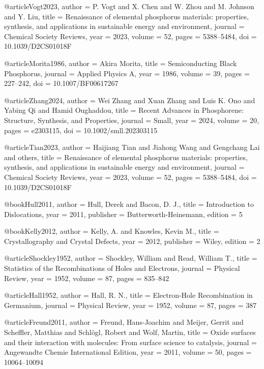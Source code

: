 @article{Vogt2023,
  author    = {P. Vogt and X. Chen and W. Zhou and M. Johnson and Y. Liu},
  title     = {Renaissance of elemental phosphorus materials: properties, synthesis, and applications in sustainable energy and environment},
  journal   = {Chemical Society Reviews},
  year      = {2023},
  volume    = {52},
  pages     = {5388--5484},
  doi       = {10.1039/D2CS01018F}
}

@article{Morita1986,
  author    = {Akira Morita},
  title     = {Semiconducting Black Phosphorus},
  journal   = {Applied Physics A},
  year      = {1986},
  volume    = {39},
  pages     = {227--242},
  doi       = {10.1007/BF00617267}
}

@article{Zhang2024,
  author    = {Wei Zhang and Xuan Zhang and Luis K. Ono and Yabing Qi and Hamid Oughaddou},
  title     = {Recent Advances in Phosphorene: Structure, Synthesis, and Properties},
  journal   = {Small},
  year      = {2024},
  volume    = {20},
  pages     = {e2303115},
  doi       = {10.1002/smll.202303115}
}

@article{Tian2023,
  author    = {Haijiang Tian and Jiahong Wang and Gengchang Lai and others},
  title     = {Renaissance of elemental phosphorus materials: properties, synthesis, and applications in sustainable energy and environment},
  journal   = {Chemical Society Reviews},
  year      = {2023},
  volume    = {52},
  pages     = {5388--5484},
  doi       = {10.1039/D2CS01018F}
}


@book{Hull2011,
  author = {Hull, Derek and Bacon, D. J.},
  title = {Introduction to Dislocations},
  year = {2011},
  publisher = {Butterworth-Heinemann},
  edition = {5}
}

@book{Kelly2012,
  author = {Kelly, A. and Knowles, Kevin M.},
  title = {Crystallography and Crystal Defects},
  year = {2012},
  publisher = {Wiley},
  edition = {2}
}

@article{Shockley1952,
  author = {Shockley, William and Read, William T.},
  title = {Statistics of the Recombinations of Holes and Electrons},
  journal = {Physical Review},
  year = {1952},
  volume = {87},
  pages = {835--842}
}

@article{Hall1952,
  author = {Hall, R. N.},
  title = {Electron-Hole Recombination in Germanium},
  journal = {Physical Review},
  year = {1952},
  volume = {87},
  pages = {387}
}

@article{Freund2011,
  author = {Freund, Hans-Joachim and Meijer, Gerrit and Scheffler, Matthias and Schl{\"o}gl, Robert and Wolf, Martin},
  title = {Oxide surfaces and their interaction with molecules: From surface science to catalysis},
  journal = {Angewandte Chemie International Edition},
  year = {2011},
  volume = {50},
  pages = {10064--10094}
}

